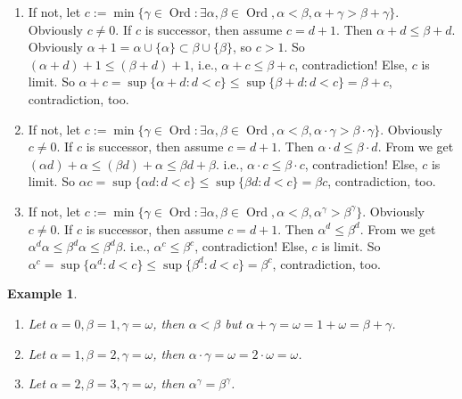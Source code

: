 \documentclass{ctexart}
\DeclareMathOperator{\ord}{Ord}
\newtheorem{example}{Example}
\begin{document}
\begin{solution}
 \begin{enumerate}[label=\alph*,ref=\theproblem.\alph*]
  \item If not, let $c:=\min\{\gamma\in\ord:\exists \alpha,\beta\in\ord,\alpha< \beta,\alpha+\gamma> \beta+\gamma\}$. Obviously $c\neq 0$. If $c$ is successor, then assume $c=d+1$. Then $\alpha+d\leq \beta+d$. Obviously $\alpha+1=\alpha\cup\{\alpha\}\subset \beta\cup\{\beta\}$, so $c>1$. So $(\alpha+d)+1\leq (\beta+d)+1$, i.e., $\alpha+c\leq \beta+c$, contradiction! Else, $c$ is limit. So $\alpha+c=\sup\{\alpha+d:d<c\}\leq \sup\{\beta+d:d<c\}=\beta+c$, contradiction, too. 
  \item If not, let $c:=\min\{\gamma\in\ord:\exists \alpha,\beta\in\ord,\alpha< \beta,\alpha\cdot\gamma> \beta\cdot\gamma\}$. Obviously $c\neq 0$. If $c$ is successor, then assume $c=d+1$. Then $\alpha\cdot d\leq \beta\cdot d$. From  we get $(\alpha d)+\alpha\leq (\beta d)+\alpha\leq \beta d+\beta$. i.e., $\alpha\cdot c\leq \beta\cdot c$, contradiction! Else, $c$ is limit. So $\alpha c=\sup\{\alpha d:d<c\}\leq \sup\{\beta d:d<c\}=\beta c$, contradiction, too. 
  \item If not, let $c:=\min\{\gamma\in\ord:\exists \alpha,\beta\in\ord,\alpha< \beta,\alpha^\gamma> \beta^\gamma\}$. Obviously $c\neq 0$. If $c$ is successor, then assume $c=d+1$. Then $\alpha^d\leq \beta^d$. From  we get $\alpha^d \alpha\leq \beta^d\alpha\leq \beta^d\beta$. i.e., $\alpha^c\leq \beta^c$, contradiction! Else, $c$ is limit. So $\alpha^c=\sup\{\alpha^d:d<c\}\leq \sup\{\beta^d:d<c\}=\beta^c$, contradiction, too. 
  
    
 \end{enumerate}
\end{solution}
\begin{example}
 \begin{enumerate}[label=\alph*,ref=Example\theexample.\alph*]
  \item\label{it:71} Let $\alpha=0,\beta=1,\gamma=\omega$, then $\alpha<\beta$ but $\alpha+\gamma=\omega=1+\omega=\beta+\gamma$. 
  \item\label{it:72} Let $\alpha=1,\beta=2,\gamma=\omega$, then $\alpha\cdot \gamma=\omega=2\cdot\omega =\omega$. 
  \item\label{it:73}  Let $\alpha=2,\beta=3,\gamma=\omega$, then $\alpha^\gamma=\beta^\gamma$. 
 \end{enumerate}
\end{example}
\end{document}
